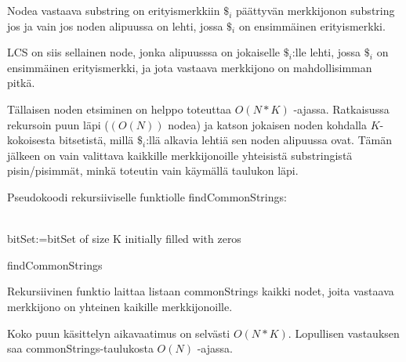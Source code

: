 \documentclass{article}
\begin{document}
    Nodea vastaava substring on erityismerkkiin $\$_i$ päättyvän merkkijonon substring jos ja vain jos noden alipuussa on lehti, jossa
    $\$_i$ on ensimmäinen erityismerkki.
    
    LCS on siis sellainen node, jonka alipuusssa on jokaiselle $\$_i$:lle lehti, jossa $\$_i$ on ensimmäinen erityismerkki, ja jota
    vastaava merkkijono on mahdollisimman pitkä.
    
    Tällaisen noden etsiminen on helppo toteuttaa $O(N*K)$ -ajassa. Ratkaisussa rekursoin puun läpi ($(O(N))$ nodea) ja katson 
    jokaisen noden kohdalla $K$-kokoisesta bitsetistä, millä $\$_i$:llä alkavia lehtiä sen noden alipuussa ovat. Tämän jälkeen
    on vain valittava kaikkille merkkijonoille yhteisistä substringistä pisin/pisimmät, minkä toteutin vain käymällä taulukon
    läpi.
    \newpage
    
    Pseudokoodi rekursiiviselle funktiolle findCommonStrings:
    \\ \\
    \begin{algorithm}[H]
        bitSet:=bitSet of size K initially filled with zeros\;
        \caption{findCommonStrings}
    \end{algorithm}

    \medskip \medskip
    Rekursiivinen funktio laittaa listaan commonStrings kaikki nodet, joita vastaava merkkijono on yhteinen kaikille merkkijonoille.
    
    Koko puun käsittelyn aikavaatimus on selvästi $O(N*K)$. Lopullisen vastauksen saa commonStrings-taulukosta $O(N)$ -ajassa.
    
    
    
\end{document}
